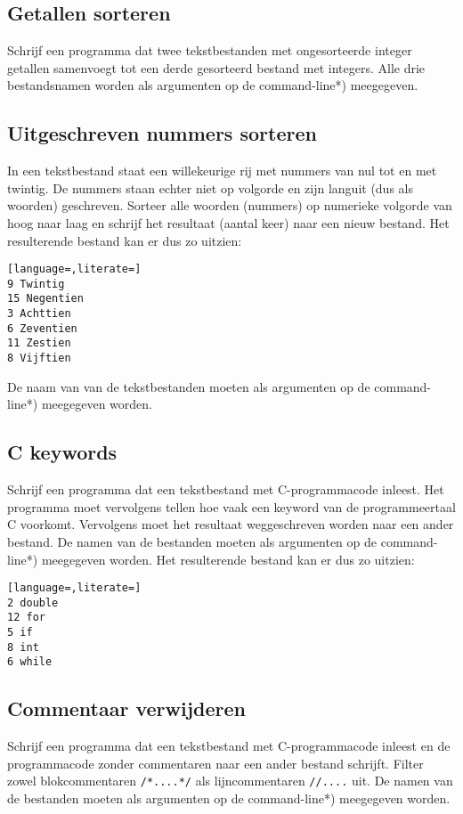 \documentclass[a4paper,10pt,fleqn,twoside]{article}
\begin{document}
\subsection{Getallen sorteren }
Schrijf een programma dat twee tekstbestanden met ongesorteerde integer getallen samenvoegt tot een derde gesorteerd bestand met integers. Alle drie bestandsnamen worden als argumenten op de command-line*) meegegeven.

\subsection{Uitgeschreven nummers sorteren}
In een tekstbestand staat een willekeurige rij met nummers van nul tot en met twintig. De nummers staan echter niet op volgorde en zijn languit (dus als woorden) geschreven. Sorteer alle woorden (nummers) op numerieke volgorde van hoog naar laag en schrijf het resultaat (aantal keer) naar een nieuw bestand. Het resulterende bestand kan er dus zo uitzien:

\begin{lstlisting}[language=,literate=]
9 Twintig
15 Negentien
3 Achttien
6 Zeventien
11 Zestien
8 Vijftien
\end{lstlisting}

De naam van van de tekstbestanden moeten als argumenten op de command-line*) meegegeven worden.

\subsection{C keywords}
Schrijf een programma dat een tekstbestand met C-programmacode inleest. Het programma moet vervolgens tellen hoe vaak een keyword van de programmeertaal C voorkomt. Vervolgens moet het resultaat weggeschreven worden naar een ander bestand. De namen van de bestanden moeten als argumenten op de command-line*) meegegeven worden.  Het resulterende bestand kan er dus zo uitzien:

\begin{lstlisting}[language=,literate=]
2 double
12 for
5 if
8 int
6 while
\end{lstlisting}

\subsection{Commentaar verwijderen}
Schrijf een programma dat een tekstbestand met C-programmacode inleest en de programmacode zonder commentaren naar een ander bestand schrijft. Filter zowel blokcommentaren \lstinline|/*....*/| als lijncommentaren \lstinline|//....| uit. De namen van de bestanden moeten als argumenten op de command-line*) meegegeven worden. 
\end{document}

